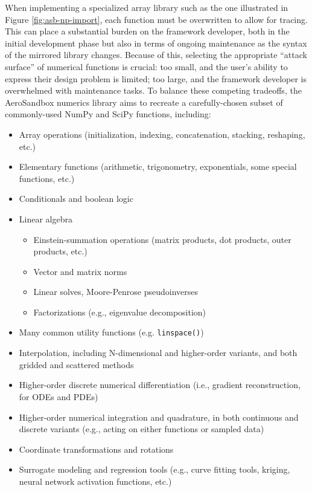 When implementing a specialized array library such as the one illustrated in Figure \ref{fig:asb-np-import}, each function must be overwritten to allow for tracing. This can place a substantial burden on the framework developer, both in the initial development phase but also in terms of ongoing maintenance as the syntax of the mirrored library changes. Because of this, selecting the appropriate ``attack surface'' of numerical functions is crucial: too small, and the user's ability to express their design problem is limited; too large, and the framework developer is overwhelmed with maintenance tasks. To balance these competing tradeoffs, the AeroSandbox numerics library aims to recreate a carefully-chosen subset of commonly-used NumPy and SciPy functions, including:

\begin{itemize}[noitemsep]
    \item Array operations (initialization, indexing, concatenation, stacking, reshaping, etc.)
    \item Elementary functions (arithmetic, trigonometry, exponentials, some special functions, etc.)
    \item Conditionals and boolean logic
    \item Linear algebra
    \begin{itemize}[noitemsep]
        \item Einstein-summation operations (matrix products, dot products, outer products, etc.)
        \item Vector and matrix norms
        \item Linear solves, Moore-Penrose pseudoinverses
        \item Factorizations (e.g., eigenvalue decomposition)
    \end{itemize}
    \item Many common utility functions (e.g. \texttt{linspace()})
    \item Interpolation, including N-dimensional and higher-order variants, and both gridded and scattered methods
    \item Higher-order discrete numerical differentiation (i.e., gradient reconstruction, for ODEs and PDEs)
    \item Higher-order numerical integration and quadrature, in both continuous and discrete variants (e.g., acting on either functions or sampled data)
    \item Coordinate transformations and rotations
    \item Surrogate modeling and regression tools (e.g., curve fitting tools, kriging, neural network activation functions, etc.)
\end{itemize}

